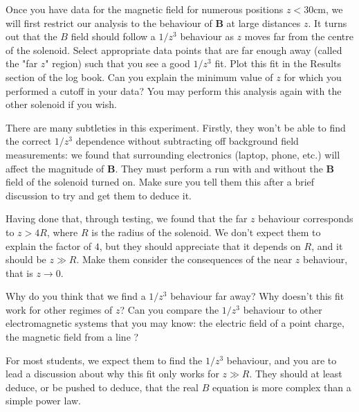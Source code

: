 \documentclass[12pt]{report}
\begin{document}
Once you have data for the magnetic field for numerous positions $z<30$cm, we will first restrict our analysis to the behaviour of $\mathbf{B}$ at large distances $z$. It turns out that the $B$ field should follow a $1/z^3$ behaviour as $z$ moves far from the centre of the solenoid. 
{\color{blue}Select appropriate data points that are far enough away (called the "far $z$" region) such that you see a good $1/z^3$ fit. Plot this fit in the Results section of the log book. Can you explain the minimum value of $z$ for which you performed a cutoff in your data?} You may perform this analysis again with the other solenoid if you wish.



\begin{tcolorbox}
There are many subtleties in this experiment. Firstly, they won't be able to find the correct $1/z^3$ dependence without subtracting off background field measurements: we found that surrounding electronics (laptop, phone, etc.) will affect the magnitude of $\mathbf{B}$. They must perform a run with and without the $\mathbf{B}$ field of the solenoid turned on. Make sure you tell them this after a brief discussion to try and get them to deduce it.
\end{tcolorbox}
\begin{tcolorbox}
Having done that, through testing, we found that the far $z$ behaviour corresponds to $z>4R$, where $R$ is the radius of the solenoid. We don't expect them to explain the factor of $4$, but they should appreciate  that it depends on $R$, and it should be $z \gg R$. Make them consider the consequences of the near $z$ behaviour, that is $z \rightarrow 0$.
\end{tcolorbox}


{\color{blue} Why do you think that we find a $1/z^3$ behaviour far away?
Why doesn't this fit work for other regimes of $z$?
Can you compare the $1/z^3$ behaviour to other electromagnetic systems that you may know: the electric field of a point charge, the magnetic field from a line
?}
\begin{tcolorbox}
For most students, we expect them to find the $1/z^3$ behaviour, and you are to lead a discussion about why this fit only works for $z\gg R$. They should at least deduce, or be pushed to deduce, that the real $B$ equation is more complex than a simple power law.
\end{tcolorbox}
\end{document}
